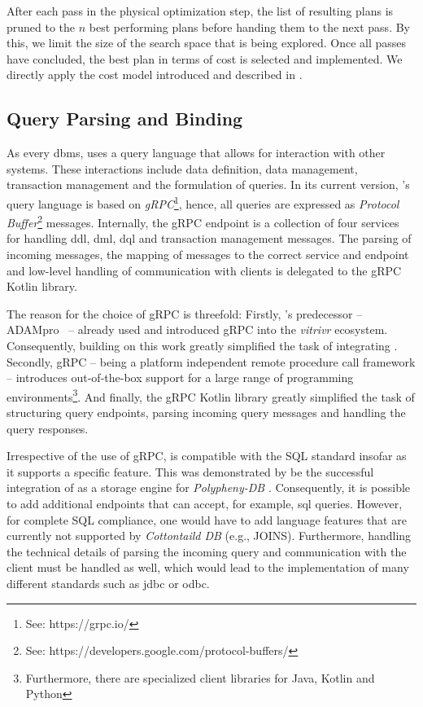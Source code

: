After each pass in the physical optimization step, the list of resulting plans is pruned to the $n$ best performing plans before handing them to the next pass. By this, we limit the size of the search space that is being explored. Once all passes have concluded, the best plan in terms of cost is selected and implemented. We directly apply the cost model introduced and described in .

\subsection{Query Parsing and Binding}
As every \acrshort{dbms}, \cottontail{} uses a query language that allows for interaction with other systems. These interactions include data definition, data management, transaction management and the formulation of queries. In its current version, \cottontail{}'s query language is based on \emph{gRPC}\footnote{See: https://grpc.io/}, hence, all queries are expressed as \emph{Protocol Buffer}\footnote{See: https://developers.google.com/protocol-buffers/} messages. Internally, the gRPC endpoint is a collection of four services for handling \acrshort{ddl}, \acrshort{dml}, \acrshort{dql} and transaction management messages. The parsing of incoming messages, the mapping of messages to the correct service and endpoint and low-level handling of communication with clients is delegated to the gRPC Kotlin library. 

The reason for the choice of gRPC is threefold: Firstly, \cottontail{}'s predecessor -- ADAMpro~\cite{Giangreco:2016Adam} -- already used and introduced gRPC into the \emph{vitrivr} ecosystem. Consequently, building on this work greatly simplified the task of integrating \cottontail{}. Secondly, gRPC -- being a platform independent remote procedure call framework -- introduces out-of-the-box support for a large range of programming environments\footnote{Furthermore, there are specialized client libraries for Java, Kotlin and Python}. And finally, the gRPC Kotlin library greatly simplified the task of structuring query endpoints, parsing incoming query messages and handling the query responses.

Irrespective of the use of gRPC, \cottontail{} is compatible with the SQL standard insofar as it supports a specific feature. This was demonstrated by be the successful integration of \cottontail{} as a storage engine for \emph{Polypheny-DB} . Consequently, it is possible to add additional endpoints that can accept, for example, \acrshort{sql} queries. However, for complete SQL compliance, one would have to add language features that are currently not supported by \emph{Cottontaild DB} (e.g., JOINS). Furthermore, handling the technical details of parsing the incoming query and communication with the client must be handled as well, which would lead to the implementation of many different standards such as \acrshort{jdbc} or \acrshort{odbc}.

